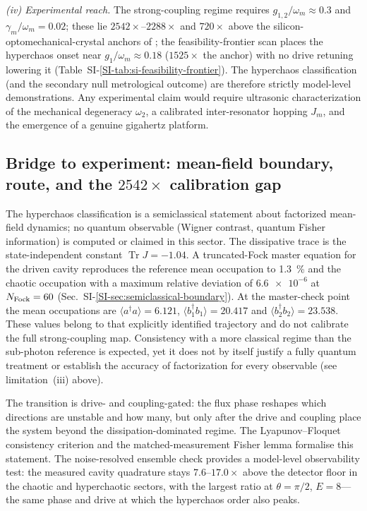\documentclass[Phys]{SciPost}
\newcommand{\Tr}{\operatorname{Tr}}
\begin{document}
\emph{(iv) Experimental reach.} The strong-coupling regime requires $g_{1,2}/\omega_m\approx\num{0.3}$ and $\gamma_m/\omega_m=\num{0.02}$; these lie $\num{2542}\times$--$\num{2288}\times$ and $\num{720}\times$ above the silicon-optomechanical-crystal anchors of \cite{Mayor2025,Mathew2020}; the feasibility-frontier scan places the hyperchaos onset near $g_1/\omega_m\approx\num{0.18}$ ($\num{1525}\times$ the anchor) with no drive retuning lowering it (Table~SI-\ref{SI-tab:si-feasibility-frontier}). The hyperchaos classification (and the secondary null metrological outcome) are therefore strictly model-level demonstrations. Any experimental claim would require ultrasonic characterization of the mechanical degeneracy $\omega_2$, a calibrated inter-resonator hopping $J_m$, and the emergence of a genuine gigahertz platform.

\subsection{Bridge to experiment: mean-field boundary, route, and the $\num{2542}\times$ calibration gap}

The hyperchaos classification is a semiclassical statement about factorized mean-field dynamics; no quantum observable (Wigner contrast, quantum Fisher information) is computed or claimed in this sector. The dissipative trace is the state-independent constant $\Tr J=-\num{1.04}$. A truncated-Fock master equation for the driven cavity reproduces the reference mean occupation to \qty{1.3}{\percent} and the chaotic occupation with a maximum relative deviation of $\num{6.6e-6}$ at $N_{\rm Fock}=\num{60}$ (Sec.~SI-\ref{SI-sec:semiclassical-boundary}). At the master-check point the mean occupations are $\langle a^\dagger a\rangle=\num{6.121}$, $\langle b_1^\dagger b_1\rangle=\num{20.417}$ and $\langle b_2^\dagger b_2\rangle=\num{23.538}$. These values belong to that explicitly identified trajectory and do not calibrate the full strong-coupling map. Consistency with a more classical regime than the sub-photon reference is expected, yet it does not by itself justify a fully quantum treatment or establish the accuracy of factorization for every observable (see limitation~(iii) above).

The transition is drive- and coupling-gated: the flux phase reshapes which directions are unstable and how many, but only after the drive and coupling place the system beyond the dissipation-dominated regime. The Lyapunov--Floquet consistency criterion and the matched-measurement Fisher lemma formalise this statement. The noise-resolved ensemble check provides a model-level observability test: the measured cavity quadrature stays $\num{7.6}$--$\num{17.0}\times$ above the detector floor in the chaotic and hyperchaotic sectors, with the largest ratio at $\theta=\pi/2$, $E=\num{8}$---the same phase and drive at which the hyperchaos order also peaks.
\end{document}
